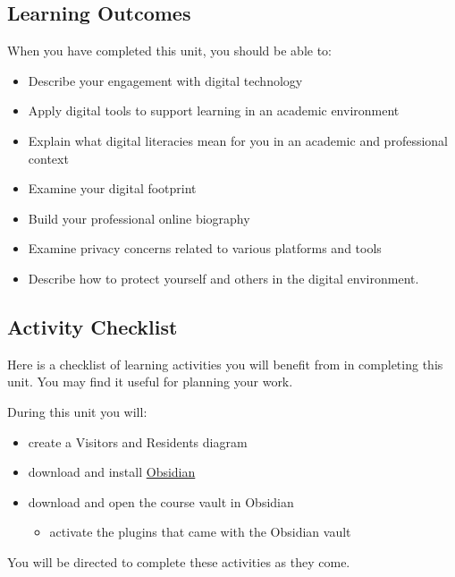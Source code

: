 \documentclass[
]{book}
\providecommand{\tightlist}{%
  \setlength{\itemsep}{0pt}\setlength{\parskip}{0pt}}
\theoremstyle{definition}
\theoremstyle{definition}
\theoremstyle{definition}
\theoremstyle{definition}
\theoremstyle{remark}
\begin{document}
\hypertarget{learning-outcomes}{%
\subsection*{Learning Outcomes}\label{learning-outcomes}}

When you have completed this unit, you should be able to:

\begin{itemize}
\tightlist
\item
  Describe your engagement with digital technology\\
\item
  Apply digital tools to support learning in an academic environment\\
\item
  Explain what digital literacies mean for you in an academic and professional context\\
\item
  Examine your digital footprint\\
\item
  Build your professional online biography\\
\item
  Examine privacy concerns related to various platforms and tools\\
\item
  Describe how to protect yourself and others in the digital environment.\\
\end{itemize}

\hypertarget{activity-checklist}{%
\subsection*{Activity Checklist}\label{activity-checklist}}

Here is a checklist of learning activities you will benefit from in completing this unit. You may find it useful for planning your work.

\begin{reflect}
During this unit you will:

\begin{itemize}
\tightlist
\item
  create a Visitors and Residents diagram\\
\item
  download and install \href{https://obsidian.md}{Obsidian}\\
\item
  download and open the course vault in Obsidian

  \begin{itemize}
  \tightlist
  \item
    activate the plugins that came with the Obsidian vault
  \end{itemize}
\end{itemize}

You will be directed to complete these activities as they come.
\end{reflect}
\end{document}
